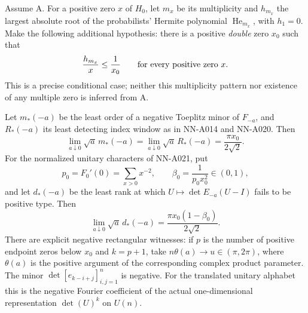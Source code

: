 \begin{theorem}
\label{thm:analytic-dominant-double}
Assume A. For a positive zero $x$ of $H_0$, let $m_x$ be its
multiplicity and $h_{m_x}$ the largest absolute root of the
probabilists' Hermite polynomial $\operatorname{He}_{m_x}$,
with $h_1=0$. Make the following additional hypothesis:
there is a positive \emph{double} zero $x_0$ such that
\begin{equation}\label{eq:analytic-dominant-double-hypothesis}
                    \frac{h_{m_x}}x\le\frac1{x_0}
                    \qquad\hbox{for every positive zero }x.
\end{equation}
This is a precise conditional case; neither this multiplicity pattern
nor existence of any multiple zero is inferred from A.

Let $m_*(-a)$ be the least order of a negative Toeplitz minor of
$F_{-a}$, and $R_*(-a)$ its least detecting index window as in
NN-A014 and NN-A020. Then
\begin{equation}\label{eq:analytic-sharp-order-window}
       \lim_{a\downarrow0}\sqrt a\,m_*(-a)
        =\lim_{a\downarrow0}\sqrt a\,R_*(-a)
                       =\frac{\pi x_0}{2\sqrt2}.
\end{equation}
For the normalized unitary characters of NN-A021, put
\[
 p_0=F_0'(0)=\sum_{x>0}x^{-2},\qquad
 \beta_0=\frac1{p_0x_0^2}\in(0,1),
\]
and let $d_*(-a)$ be the least rank at which
$U\mapsto\det E_{-a}(U-I)$ fails to be positive type. Then
\begin{equation}\label{eq:analytic-sharp-unitary-rank}
       \lim_{a\downarrow0}\sqrt a\,d_*(-a)
                       =\frac{\pi x_0(1-\beta_0)}{2\sqrt2}.
\end{equation}
There are explicit negative rectangular witnesses: if $p$ is the
number of positive endpoint zeros below $x_0$ and $k=p+1$, take
$n\theta(a)\to u\in(\pi,2\pi)$, where $\theta(a)$ is the positive
argument of the corresponding complex product parameter. The minor
$\det[e_{k-i+j}]_{i,j=1}^n$ is negative. For the translated unitary
alphabet this is the negative Fourier coefficient of the actual
one-dimensional representation $\det(U)^k$ on $U(n)$.
\end{theorem}

